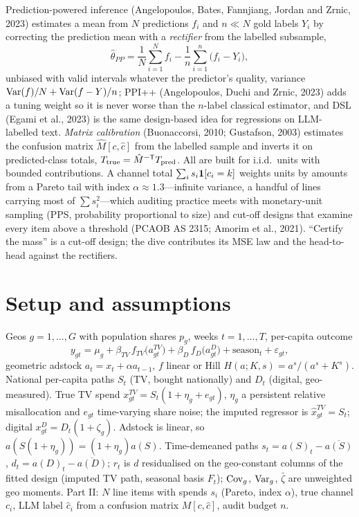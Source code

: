 Prediction-powered inference (Angelopoulos, Bates, Fannjiang, Jordan and Zrnic, 2023) estimates a mean from $N$ predictions $f_i$ and $n \ll N$ gold labels $Y_i$ by correcting the prediction mean with a \emph{rectifier} from the labelled subsample,
\begin{equation}
\hat\theta_{PP} = \frac1N\sum_{i=1}^{N} f_i - \frac1n\sum_{i=1}^{n}\big(f_i - Y_i\big),
\label{arch:eq:ppi}
\end{equation}
unbiased with valid intervals whatever the predictor's quality, variance $\operatorname{Var}(f)/N + \operatorname{Var}(f-Y)/n$; PPI++ (Angelopoulos, Duchi and Zrnic, 2023) adds a tuning weight so it is never worse than the $n$-label classical estimator, and DSL (Egami et al., 2023) is the same design-based idea for regressions on LLM-labelled text. \emph{Matrix calibration} (Buonaccorsi, 2010; Gustafson, 2003) estimates the confusion matrix $\hat M[c,\hat c]$ from the labelled sample and inverts it on predicted-class totals, $T_{\mathrm{true}} = \hat M^{-\mathsf{T}}T_{\mathrm{pred}}$. All are built for i.i.d.\ units with bounded contributions. A channel total $\sum_i s_i\mathbf{1}[c_i = k]$ weights units by amounts from a Pareto tail with index $\alpha \approx 1.3$---infinite variance, a handful of lines carrying most of $\sum s_i^2$---which auditing practice meets with monetary-unit sampling (PPS, probability proportional to size) and cut-off designs that examine every item above a threshold (PCAOB AS 2315; Amorim et al., 2021). ``Certify the mass'' is a cut-off design; the dive contributes its MSE law and the head-to-head against the rectifiers.

\section{Setup and assumptions}

Geos $g = 1,\ldots,G$ with population shares $p_g$, weeks $t = 1,\ldots,T$, per-capita outcome
\begin{equation}
y_{gt} = \mu_g + \beta_{TV}\, f_{TV}\big(a^{TV}_{gt}\big) + \beta_D\, f_D\big(a^D_{gt}\big) + \text{season}_t + \varepsilon_{gt},
\label{arch:eq:dgp}
\end{equation}
geometric adstock $a_t = x_t + \alpha a_{t-1}$, $f$ linear or Hill $H(a;K,s) = a^s/(a^s+K^s)$. National per-capita paths $S_t$ (TV, bought nationally) and $D_t$ (digital, geo-measured). True TV spend $x^{TV}_{gt} = S_t(1+\eta_g+e_{gt})$, $\eta_g$ a persistent relative misallocation and $e_{gt}$ time-varying share noise; the imputed regressor is $\hat x^{TV}_{gt} = S_t$; digital $x^D_{gt} = D_t(1+\zeta_g)$. Adstock is linear, so $a(S(1+\eta_g)) = (1+\eta_g)a(S)$. Time-demeaned paths $s_t = a(S)_t - \overline{a(S)}$, $d_t = a(D)_t - \overline{a(D)}$; $r_t$ is $d$ residualised on the geo-constant columns of the fitted design (imputed TV path, seasonal basis $F_t$); $\operatorname{Cov}_g$, $\operatorname{Var}_g$, $\bar\zeta$ are unweighted geo moments. Part II: $N$ line items with spends $s_i$ (Pareto, index $\alpha$), true channel $c_i$, LLM label $\hat c_i$ from a confusion matrix $M[c,\hat c]$, audit budget $n$.


